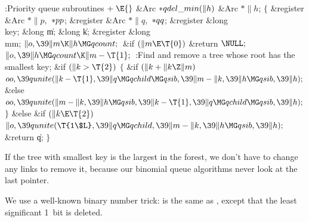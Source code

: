 \Y\B\4:Priority queue subroutines\X${}\mathrel+\E{}$\6
\1\1\&{Arc} ${}{*}\\{qdel\_min}(\|h){}$\6
\&{Arc} ${}{*}\|h{}$;\2\2\6
${}\{{}$\5
\1\&{register} \&{Arc} ${}{*}\|p,{}$ ${}{*}\\{pp}{}$;\6
\&{register} \&{Arc} ${}{*}\|q,{}$ ${}{*}\\{qq}{}$;\6
\&{register} \&{long} \\{key};\6
\&{long} \|m;\6
\&{long} \|k;\6
\&{register} \&{long} \\{mm};\7
${}\|o,\39\|m\K\|h\MG\\{qcount};{}$\6
\&{if} ${}(\|m\E\T{0}){}$\1\5
\&{return} ${}\NULL;{}$\2\6
${}\|o,\39\|h\MG\\{qcount}\K\|m-\T{1};{}$\6
:Find and remove a tree whose root  has the smallest key\X;\6
\&{if} ${}(\|k>\T{2}){}$\5
${}\{{}$\1\6
\&{if} ${}(\|k+\|k\Z\|m){}$\1\5
${}\\{oo},\39\\{qunite}(\|k-\T{1},\39\|q\MG\\{qchild}\MG\\{qsib},\39\|m-\|k,\39%
\|h\MG\\{qsib},\39\|h);{}$\2\6
\&{else}\1\5
${}\\{oo},\39\\{qunite}(\|m-\|k,\39\|h\MG\\{qsib},\39\|k-\T{1},\39\|q\MG%
\\{qchild}\MG\\{qsib},\39\|h);{}$\2\6
\4${}\}{}$\5
\2\&{else} \&{if} ${}(\|k\E\T{2}){}$\1\5
${}\|o,\39\\{qunite}(\T{1\$L},\39\|q\MG\\{qchild},\39\|m-\|k,\39\|h\MG\\{qsib},%
\39\|h);{}$\2\6
\&{return} \|q;\6
\4${}\}{}$\2\par
\fi

If the tree with smallest key is the largest in the forest,
we don't have to change any links to remove it,
because our binomial queue algorithms never look at the last 
pointer.

We use a well-known binary number trick:  is the same
as
, except that the least significant 1~bit is deleted.

